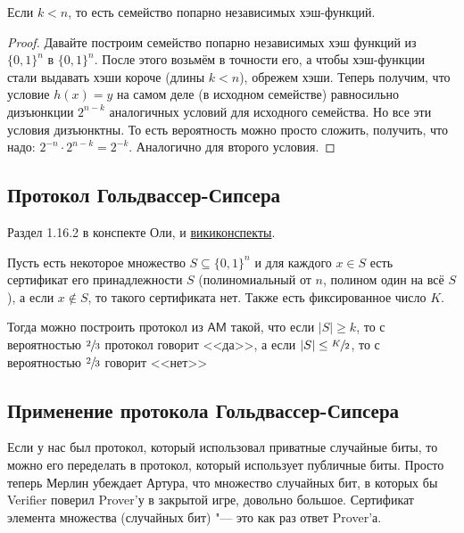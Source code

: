 	\begin{conseq}
		Если $k<n$, то есть семейство попарно независимых хэш-функций.
	\end{conseq}
	\begin{proof}
		Давайте построим семейство попарно независимых хэш функций из $\{0,1\}^n$ в $\{0,1\}^n$.
		После этого возьмём в точности его, а чтобы хэш-функции стали выдавать хэши короче (длины $k<n$),
		обрежем хэши.
		Теперь получим, что условие $h(x)=y$ на самом деле (в исходном семействе) равносильно дизъюнкции $2^{n-k}$ аналогичных условий для исходного семейства.
		Но все эти условия дизъюнктны.
		То есть вероятность можно просто сложить, получить, что надо: $2^{-n} \cdot 2^{n-k} = 2^{-k}$.
		Аналогично для второго условия.
	\end{proof}

\subsection{Протокол Гольдвассер-Сипсера}
	Раздел 1.16.2 в конспекте Оли, и \href{http://neerc.ifmo.ru/wiki/index.php?title=\%D0\%9F\%D1\%80\%D0\%BE\%D1\%82\%D0\%BE\%D0\%BA\%D0\%BE\%D0\%BB_\%D0\%93\%D0\%BE\%D0\%BB\%D0\%B4\%D0\%B2\%D0\%B0\%D1\%81\%D1\%81\%D0\%B5\%D1\%80-\%D0\%A1\%D0\%B8\%D0\%BF\%D1\%81\%D0\%B5\%D1\%80\%D0\%B0_\%D0\%B4\%D0\%BB\%D1\%8F_\%D0\%BE\%D1\%86\%D0\%B5\%D0\%BD\%D0\%BA\%D0\%B8_\%D1\%80\%D0\%B0\%D0\%B7\%D0\%BC\%D0\%B5\%D1\%80\%D0\%B0_\%D0\%BC\%D0\%BD\%D0\%BE\%D0\%B6\%D0\%B5\%D1\%81\%D1\%82\%D0\%B2\%D0\%B0}{викиконспекты}.

	\begin{theorem}
		Пусть есть некоторое множество $S \subseteq \{0, 1\}^n$ и для каждого $x \in S$
		есть сертификат его принадлежности $S$ (полиномиальный от $n$, полином один на всё $S$),
		а если $x \notin S$, то такого сертификата нет.
		Также есть фиксированное число $K$.

		Тогда можно построить протокол из $\mathsf{AM}$ такой, что если $|S| \ge k$, то с вероятностью $\sfrac 23$ протокол говорит <<да>>,
		а если $|S| \le \sfrac{K}{2}$, то с вероятностью $\sfrac 23$ говорит <<нет>>
	\end{theorem}

\subsection{Применение протокола Гольдвассер-Сипсера}
	Если у нас был протокол, который использовал приватные случайные биты, то можно его переделать в протокол, который использует публичные биты.
	Просто теперь Мерлин убеждает Артура, что множество случайных бит, в которых бы Verifier поверил Prover'у в закрытой игре, довольно большое.
	Сертификат элемента множества (случайных бит) "--- это как раз ответ Prover'а.
